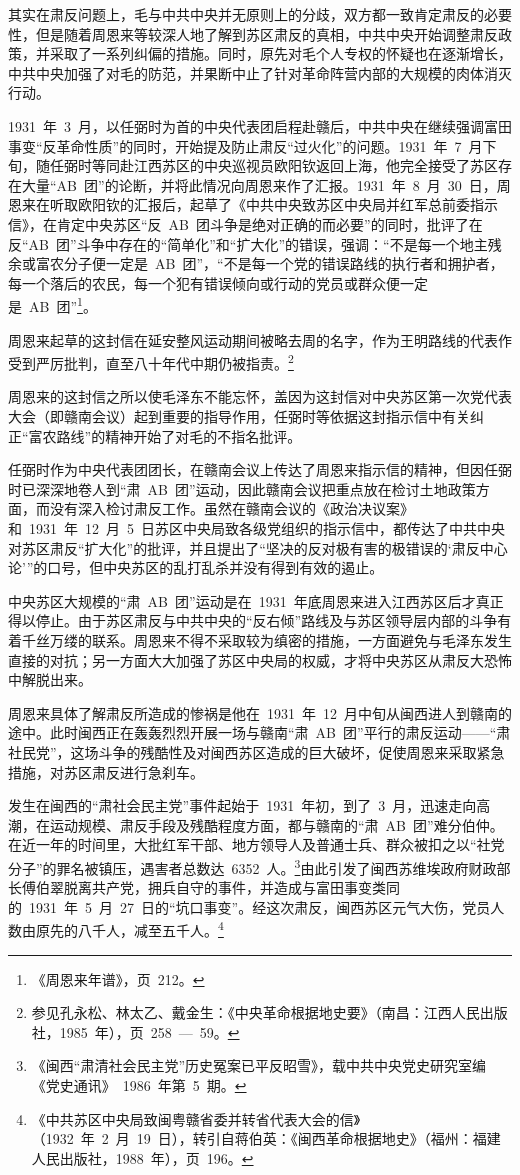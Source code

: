 其实在肃反问题上，毛与中共中央并无原则上的分歧，双方都一致肯定肃反的必要性，但是随着周恩来等较深人地了解到苏区肃反的真相，中共中央开始调整肃反政策，并采取了一系列纠偏的措施。同时，原先对毛个人专权的怀疑也在逐渐增长，中共中央加强了对毛的防范，并果断中止了针对革命阵营内部的大规模的肉体消灭行动。

1931~年~3~月，以任弼时为首的中央代表团启程赴赣后，中共中央在继续强调富田事变“反革命性质”的同时，开始提及防止肃反“过火化”的问题。1931~年~7~月下旬，随任弼时等同赴江西苏区的中央巡视员欧阳钦返回上海，他完全接受了苏区存在大量“AB~团”的论断，并将此情况向周恩来作了汇报。1931~年~8~月~30~日，周恩来在听取欧阳钦的汇报后，起草了《中共中央致苏区中央局并红军总前委指示信》，在肯定中央苏区“反~AB~团斗争是绝对正确的而必要”的同时，批评了在反“AB~团”斗争中存在的“简单化”和“扩大化”的错误，强调：“不是每一个地主残余或富农分子便一定是~AB~团”，“不是每一个党的错误路线的执行者和拥护者，每一个落后的农民，每一个犯有错误倾向或行动的党员或群众便一定是~AB~团”\footnote{《周恩来年谱》，页~212。}。

周恩来起草的这封信在延安整风运动期间被略去周的名字，作为王明路线的代表作受到严厉批判，直至八十年代中期仍被指责。\footnote{参见孔永松、林太乙、戴金生：《中央革命根据地史要》（南昌：江西人民出版社，1985~年），页~258~—~59。}

周恩来的这封信之所以使毛泽东不能忘怀，盖因为这封信对中央苏区第一次党代表大会（即赣南会议）起到重要的指导作用，任弼时等依据这封指示信中有关纠正“富农路线”的精神开始了对毛的不指名批评。

任弼时作为中央代表团团长，在赣南会议上传达了周恩来指示信的精神，但因任弼时已深深地卷人到“肃~AB~团”运动，因此赣南会议把重点放在检讨土地政策方面，而没有深入检讨肃反工作。虽然在赣南会议的《政治决议案》和~1931~年~12~月~5~日苏区中央局致各级党组织的指示信中，都传达了中共中央对苏区肃反“扩大化”的批评，并且提出了“坚决的反对极有害的极错误的‘肃反中心论’”的口号，但中央苏区的乱打乱杀并没有得到有效的遏止。

中央苏区大规模的“肃~AB~团”运动是在~1931~年底周恩来进入江西苏区后才真正得以停止。由于苏区肃反与中共中央的“反右倾”路线及与苏区领导层内部的斗争有着千丝万缕的联系。周恩来不得不采取较为缜密的措施，一方面避免与毛泽东发生直接的对抗；另一方面大大加强了苏区中央局的权威，才将中央苏区从肃反大恐怖中解脱出来。

周恩来具体了解肃反所造成的惨祸是他在~1931~年~12~月中旬从闽西进人到赣南的途中。此时闽西正在轰轰烈烈开展一场与赣南“肃~AB~团”平行的肃反运动——“肃社民党”，这场斗争的残酷性及对闽西苏区造成的巨大破坏，促使周恩来采取紧急措施，对苏区肃反进行急刹车。

发生在闽西的“肃社会民主党”事件起始于~1931~年初，到了~3~月，迅速走向高潮，在运动规模、肃反手段及残酷程度方面，都与赣南的“肃~AB~团”难分伯仲。在近一年的时间里，大批红军干部、地方领导人及普通士兵、群众被扣之以“社党分子”的罪名被镇压，遇害者总数达~6352~人。\footnote{《闽西“肃清社会民主党”历史冤案已平反昭雪》，载中共中央党史研究室编《党史通讯》~1986~年第~5~期。}由此引发了闽西苏维埃政府财政部长傅伯翠脱离共产党，拥兵自守的事件，并造成与富田事变类同的~1931~年~5~月~27~日的“坑口事变”。经这次肃反，闽西苏区元气大伤，党员人数由原先的八千人，减至五千人。\footnote{《中共苏区中央局致闽粤赣省委并转省代表大会的信》（1932~年~2~月~19~日），转引自蒋伯英：《闽西革命根据地史》（福州：福建人民出版社，1988~年），页~196。}

